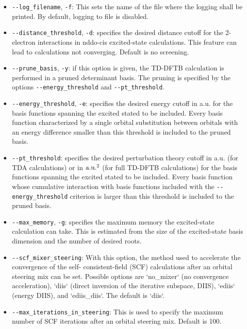 \documentclass[]{tufte-book}
\begin{document}
\begin{itemize}
\item \texttt{-{}-log\_filename}, \texttt{-f}: This sets the name of the file
  where the logging shall be printed. By default, logging to file is disabled.
\item \texttt{-{}-distance\_threshold}, \texttt{-d}: specifies the desired
  distance cutoff for the 2-electron interactions in nddo-cis excited-state
  calculations. This feature can lead to calculations not converging. Default is
    no screening.
\item \texttt{-{}-prune\_basis}, \texttt{-y}: if this option is given, the
  TD-DFTB calculation is performed in a pruned determinant basis. The pruning is 
    specified by the options \texttt{-{}-energy\_threshold} and
    \texttt{-{}-pt\_threshold}.
\item \texttt{-{}-energy\_threshold}, \texttt{-e}: specifies the desired
  energy cutoff in a.u. for the basis functions spanning the excited stated to be
    included. Every basis function characterized by a single orbital
    substitution between orbitals with an energy difference smaller than this
    threshold is included to the pruned basis.
\item \texttt{-{}-pt\_threshold}: specifies the desired
  perturbation theory cutoff in a.u. (for TDA calculations) or in ${\rm a.u.}^2$ (for
    full TD-DFTB calculations) for the basis functions spanning the excited stated to be
    included. Every basis function whose cumulative interaction with basis
    functions included with the \texttt{-{}-energy\_threshold} criterion is
    larger than this threshold is included to the pruned basis.
\item \texttt{-{}-max\_memory}, \texttt{-g}: specifies the maximum memory the
    excited-state calculation can take. This is estimated from the size of the
    excited-state basis dimension and the number of desired roots. 
\item \texttt{-{}-scf\_mixer\_steering}: With this option, the
  method used to accelerate the convergence of the self-
consistent-field (SCF) calculations after an orbital steering mix can be set. Possible options are `no\_mixer` (no convergence acceleration), `diis`
(direct inversion of the iterative subspace, DIIS), `ediis` (energy DIIS), and `ediis\_diis`. The
default is `diis`.
\item \texttt{-{}-max\_iterations\_in\_steering}: This is used to
  specify the maximum number of SCF iterations after an orbital steering mix. Default is 100.
\end{itemize}
\end{document}
